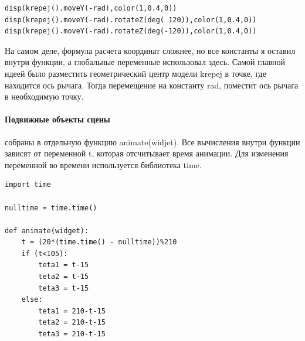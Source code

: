 \begin{lstlisting}[style=python,caption=Растановка объектов методом полярных координат]
disp(krepej().moveY(-rad),color(1,0.4,0))
disp(krepej().moveY(-rad).rotateZ(deg( 120)),color(1,0.4,0))
disp(krepej().moveY(-rad).rotateZ(deg(-120)),color(1,0.4,0))
\end{lstlisting}
 
 На самом деле, формула расчета координат сложнее, но все константы я оставил внутри функции, а глобальные переменные использовал здесь. Самой главной идеей было разместить геометрический центр модели krepej в точке, где находится ось рычага. Тогда перемещение на константу rad, поместит ось рычага в необходимую точку. 
 
 \paragraph{Подвижные объекты сцены} собраны в отдельную функцию animate(widjet). Все вычисления внутри функции зависят от переменной t, которая отсчитывает время анимации. Для изменения переменной во времени используется библиотека time. 
 
\begin{lstlisting}[style=python,caption=Работа с временной переменной]
import time

nulltime = time.time()

def animate(widget):
    t = (20*(time.time() - nulltime))%210
    if (t<105):
        teta1 = t-15
        teta2 = t-15
        teta3 = t-15
    else:
        teta1 = 210-t-15
        teta2 = 210-t-15
        teta3 = 210-t-15
\end{lstlisting}

